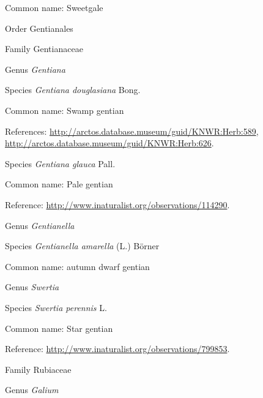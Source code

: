 \documentclass[9pt, article]{memoir}
\begin{document}
\begin{multicols}{2}
Common name: Sweetgale

\vspace{6pt}\noindent\hspace{18pt}Order Gentianales


\vspace{6pt}\noindent\hspace{24pt}Family Gentianaceae


\vspace{6pt}\noindent\hspace{30pt}Genus \textit{Gentiana}


\vspace{6pt}\noindent\hspace{36pt}Species \textit{Gentiana douglasiana} Bong.


Common name: Swamp gentian

References: 
\url{http://arctos.database.museum/guid/KNWR:Herb:589}, 
\url{http://arctos.database.museum/guid/KNWR:Herb:626}.

\vspace{6pt}\noindent\hspace{36pt}Species \textit{Gentiana glauca} Pall.


Common name: Pale gentian

Reference: 
\url{http://www.inaturalist.org/observations/114290}.

\vspace{6pt}\noindent\hspace{30pt}Genus \textit{Gentianella}


\vspace{6pt}\noindent\hspace{36pt}Species \textit{Gentianella amarella} (L.) Börner


Common name: autumn dwarf gentian

\vspace{6pt}\noindent\hspace{30pt}Genus \textit{Swertia}


\vspace{6pt}\noindent\hspace{36pt}Species \textit{Swertia perennis} L.


Common name: Star gentian

Reference: 
\url{http://www.inaturalist.org/observations/799853}.

\vspace{6pt}\noindent\hspace{24pt}Family Rubiaceae


\vspace{6pt}\noindent\hspace{30pt}Genus \textit{Galium}



\end{multicols}
\end{document}
